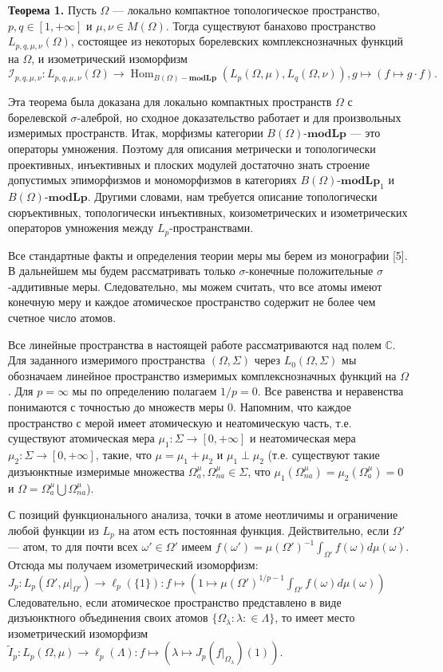 \documentclass[11pt,twoside]{article}
\begin{document}
\textbf{Теорема 1.} Пусть $\Omega$ --- локально компактное топологическое
пространство, $p,q\in[1,+\infty]$ и $\mu,\nu\in M(\Omega)$. Тогда существуют
банахово пространство $L_{p,q,\mu,\nu}(\Omega)$, состоящее из некоторых
борелевских комплекснозначных функций на $\Omega$, и изометрический изоморфизм
$$
    \mathcal{I}_{p,q,\mu,\nu}: L_{p,q,\mu,\nu}(\Omega)\to
    \operatorname{Hom}_{B(\Omega)\!-\!\mathbf{modLp}}
    (L_p(\Omega,\mu),L_q(\Omega,\nu)),g\mapsto (f\mapsto g\cdot f).
$$


Эта теорема была доказана для локально компактных пространств $\Omega$ с
борелевской $\sigma$-алеброй, но сходное доказательство работает и для
произвольных измеримых пространств. Итак, морфизмы категории
$B(\Omega)$-$\mathbf{modLp}$ --- это операторы умножения. Поэтому для описания
метрически и топологически проективных, инъективных и плоских модулей достаточно
знать строение допустимых эпиморфизмов и мономорфизмов в  категориях
$B(\Omega)$-$\mathbf{modLp}_1$ и $B(\Omega)$-$\mathbf{modLp}$. Другими словами,
нам требуется описание топологически сюръективных, топологически инъективных,
коизометрических и изометрических операторов умножения между
$L_p$-пространствами.

Все стандартные факты и определения теории меры мы берем из монографии [5]. В
дальнейшем мы будем рассматривать только $\sigma$-конечные положительные
$\sigma$-аддитивные меры. Следовательно, мы можем считать, что все атомы имеют
конечную меру и каждое атомическое пространство содержит не более чем счетное
число атомов.

Все линейные пространства в настоящей работе рассматриваются над полем
$\mathbb{C}$. Для заданного измеримого пространства $(\Omega,\Sigma)$ через
$L_0(\Omega,\Sigma)$ мы обозначаем линейное пространство измеримых
комплекснозначных функций на  $\Omega$. Для $p=\infty$ мы по определению
полагаем $1/p=0$. Все равенства и неравенства понимаются с точностью до множеств
меры $0$. Напомним, что каждое пространство с мерой имеет атомическую и
неатомическую часть, т.е. существуют атомическая мера
$\mu_1:\Sigma\to[0,+\infty]$ и неатомическая мера $\mu_2:\Sigma\to[0,+\infty]$,
такие, что $\mu=\mu_1+\mu_2$ и $\mu_1\perp\mu_2$ (т.е. существуют такие
дизъюнктные измеримые множества $\Omega_a^{\mu},\Omega_{na}^{\mu}\in\Sigma$, что
$\mu_1(\Omega_{na}^{\mu})=\mu_2(\Omega_a^{\mu})=0$ и
$\Omega=\Omega_a^{\mu}\bigcup\Omega_{na}^{\mu}$).

С позиций функционального анализа, точки в атоме неотличимы и ограничение любой
функции из $L_p$ на атом есть постоянная функция. Действительно, если $\Omega'$
--- атом, то для почти всех $\omega'\in\Omega'$ имеем
$f(\omega')={\mu(\Omega')}^{-1}\int_{\Omega'} f(\omega)d\mu(\omega)$. Отсюда мы
получаем изометрический изоморфизм: $J_p:L_p(\Omega',\mu|_{\Omega'})\to
    \ell_p(\{1\}):f\mapsto\left(1\mapsto {\mu(\Omega')}^{1/p-1}\int_{\Omega'}
    f(\omega)d\mu(\omega)\right)$ Следовательно, если атомическое пространство
представлено в виде дизъюнктного объединения своих атомов $
    \{\Omega_\lambda:\lambda:\in\Lambda \}$, то имеет место изометрический
изоморфизм $\widetilde{I}_p:L_p(\Omega,\mu) \to \ell_p(\Lambda):f\mapsto
    \left(\lambda\mapsto J_p(f|_{\Omega_\lambda})(1)\right)$.
\end{document}
